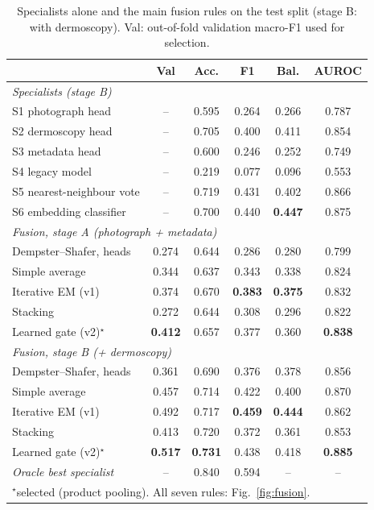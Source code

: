 \documentclass[conference]{IEEEtran}
\begin{document}
\begin{table}[t]
\centering
\caption{Specialists alone and the main fusion rules on the test split (stage B: with
dermoscopy). Val: out-of-fold validation macro-F1 used for selection.}
\label{tab:fusion}
\setlength{\tabcolsep}{3pt}
\small
\begin{tabular}{lccccc}
\toprule
 & Val & Acc. & F1 & Bal. & AUROC \\
\midrule
\multicolumn{6}{l}{\emph{Specialists (stage B)}} \\
S1 photograph head & -- & 0.595 & 0.264 & 0.266 & 0.787 \\
S2 dermoscopy head & -- & 0.705 & 0.400 & 0.411 & 0.854 \\
S3 metadata head & -- & 0.600 & 0.246 & 0.252 & 0.749 \\
S4 legacy model & -- & 0.219 & 0.077 & 0.096 & 0.553 \\
S5 nearest-neighbour vote & -- & 0.719 & 0.431 & 0.402 & 0.866 \\
S6 embedding classifier & -- & 0.700 & 0.440 & \textbf{0.447} & 0.875 \\
\midrule
\multicolumn{6}{l}{\emph{Fusion, stage A (photograph + metadata)}} \\
Dempster--Shafer, heads & 0.274 & 0.644 & 0.286 & 0.280 & 0.799 \\
Simple average & 0.344 & 0.637 & 0.343 & 0.338 & 0.824 \\
Iterative EM (v1) & 0.374 & 0.670 & \textbf{0.383} & \textbf{0.375} & 0.832 \\
Stacking & 0.272 & 0.644 & 0.308 & 0.296 & 0.822 \\
Learned gate (v2)$^\star$ & \textbf{0.412} & 0.657 & 0.377 & 0.360 & \textbf{0.838} \\
\midrule
\multicolumn{6}{l}{\emph{Fusion, stage B (+ dermoscopy)}} \\
Dempster--Shafer, heads & 0.361 & 0.690 & 0.376 & 0.378 & 0.856 \\
Simple average & 0.457 & 0.714 & 0.422 & 0.400 & 0.870 \\
Iterative EM (v1) & 0.492 & 0.717 & \textbf{0.459} & \textbf{0.444} & 0.862 \\
Stacking & 0.413 & 0.720 & 0.372 & 0.361 & 0.853 \\
Learned gate (v2)$^\star$ & \textbf{0.517} & \textbf{0.731} & 0.438 & 0.418 & \textbf{0.885} \\
\emph{Oracle best specialist} & -- & 0.840 & 0.594 & -- & -- \\
\bottomrule
\multicolumn{6}{l}{\footnotesize $^\star$selected (product pooling). All seven rules: Fig.~\ref{fig:fusion}.}
\end{tabular}
\end{table}
\end{document}
